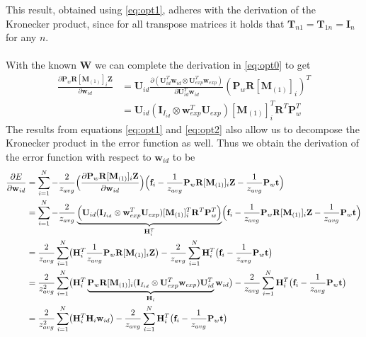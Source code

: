 \documentclass[11pt,a4paper]{report}
\begin{document}
This result, obtained using \ref{eq:opt1}, adheres with the derivation of
the Kronecker product, since for all transpose matrices it holds that $\mathbf{T}_{n1} =
\mathbf{T}_{1n} = \mathbf{I}_n$ for any $n$.\\
\\
With the known $\mathbf{W}$ we can complete the derivation in \ref{eq:opt0} to get
\begin{align}
\frac
{\partial 
\mathbf{P}_w\mathbf{R}[\mathbf{M}_{(1)}]_{i}\mathbf{Z}
}
{\partial
\mathbf{w}_{id}
}
&=\mathbf{U}_{id}
\frac
{\partial
(\mathbf{U}_{id}^T\mathbf{w}_{id} \otimes \mathbf{U}_{exp}^T\mathbf{w}_{exp})
}
{\partial
\mathbf{U}_{id}^T\mathbf{w}_{id}
}
(\mathbf{P}_w\mathbf{R}[\mathbf{M}_{(1)}]_{i})^T\nonumber\\
&=
\mathbf{U}_{id}
(\mathbf{I}_{I_{id}} \otimes
\mathbf{w}_{exp}^T\mathbf{U}_{exp})
[\mathbf{M}_{(1)}]_{i}^T\mathbf{R}^T\mathbf{P}_w^T
\end{align}
The results from equations \ref{eq:opt1} and \ref{eq:opt2} also allow us to decompose the Kronecker product
in the error function as well. Thus we obtain the derivation of the error function with respect to
$\mathbf{w}_{id}$ to be
\begin{align*}\label{eq:opt4}
\frac{\partial E}{\partial \mathbf{w}_{id}} &= \sum_{i=1}^N -\frac{2}{z_{avg}}\Bigl(
\frac{\partial \mathbf{P}_w\mathbf{R}[\mathbf{M}_{(1)}]_{i}\mathbf{Z}}
{\partial \mathbf{w}_{id}}\Bigr)\Bigl(\mathbf{f}_i - \frac{1}{z_{avg}}\mathbf{P}_w\mathbf{R}[\mathbf{M}_{(1)}]_{i}\mathbf{Z} - \frac{1}{z_{avg}}\mathbf{P}_w\mathbf{t}\Bigr)\\
&=\sum_{i=1}^N -\frac{2}{z_{avg}}\underbrace{\Bigl(\mathbf{U}_{id} (\mathbf{I}_{I_{id}} \otimes \mathbf{w}_{exp}^T\mathbf{U}_{exp}) [\mathbf{M}_{(1)}]_{i}^T\mathbf{R}^T\mathbf{P}_w^T\Bigr)}_{\mathbf{H}_i^T}\Bigl(\mathbf{f}_i - \frac{1}{z_{avg}}\mathbf{P}_w\mathbf{R}[\mathbf{M}_{(1)}]_{i}\mathbf{Z} - \frac{1}{z_{avg}}\mathbf{P}_w\mathbf{t}
\Bigr)\\
&= \frac{2}{z_{avg}}\sum_{i=1}^N\bigl(
\mathbf{H}_i^T\frac{1}{z_{avg}}\mathbf{P}_w\mathbf{R}[\mathbf{M}_{(1)}]_{i}\mathbf{Z}\bigr)
-
\frac{2}{z_{avg}}\sum_{i=1}^N \mathbf{H}_i^T\bigl(\mathbf{f}_i - \frac{1}{z_{avg}}\mathbf{P}_w\mathbf{t}
\bigr)\\
&=
\frac{2}{z_{avg}^2}\sum_{i=1}^N\bigl(
\mathbf{H}_i^T\underbrace{\mathbf{P}_w\mathbf{R}[\mathbf{M}_{(1)}]_{i}(\mathbf{I}_{I_{id}} \otimes \mathbf{U}_{exp}^T\mathbf{w}_{exp})\mathbf{U}_{id}^T}_{\mathbf{H}_i}\mathbf{w}_{id}\bigr)
-
\frac{2}{z_{avg}}\sum_{i=1}^N \mathbf{H}_i^T\bigl(\mathbf{f}_i -
\frac{1}{z_{avg}}\mathbf{P}_w\mathbf{t}\bigr)\\
&=\frac{2}{z_{avg}^2}\sum_{i=1}^N\bigl(
\mathbf{H}_i^T\mathbf{H}_i\mathbf{w}_{id}\bigr)
-
\frac{2}{z_{avg}}\sum_{i=1}^N \mathbf{H}_i^T\bigl(\mathbf{f}_i -
\frac{1}{z_{avg}}\mathbf{P}_w\mathbf{t}\bigr)
\end{align*}
\end{document}
